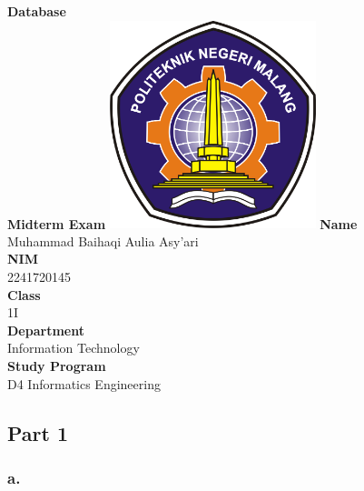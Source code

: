 \documentclass[12pt,titlepage]{article}
\newcommand{\vSubject}{Database}
\newcommand{\vSubtitle}{Midterm Exam}
\newcommand{\vName}{Muhammad Baihaqi Aulia Asy'ari}
\newcommand{\vNIM}{2241720145}
\newcommand{\vClass}{1I}
\newcommand{\vDepartment}{Information Technology}
\newcommand{\vStudyProgram}{D4 Informatics Engineering}
\begin{document}
\begin{titlepage}
    \centering
    \vfill
    {\bfseries\LARGE
        \vSubject\\
        \vskip0.25cm
        \vSubtitle
    }
    \vfill
    \includegraphics[width=6cm]{images/polinema-logo.png}
    \vfill
    {
        \textbf{Name}\\
        \vName\\
        \vskip0.5cm
        \textbf{NIM}\\
        \vNIM\\
        \vskip0.5cm
        \textbf{Class}\\
        \vClass\\
        \vskip0.5cm
        \textbf{Department}\\
        \vDepartment\\
        \vskip0.5cm
        \textbf{Study Program}\\
        \vStudyProgram
    }
\end{titlepage}

\newpage

\subsection*{Part 1}

\subsubsection*{a.}
\end{document}
